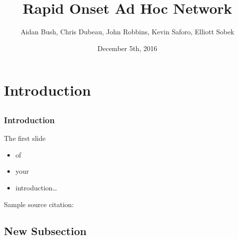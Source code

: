 \documentclass[compress]{beamer}
\title[Short Title]{Rapid Onset Ad Hoc Network}
\author[Short Author Names]{
  Aidan Bush,
  Chris Dubeau,
  John Robbins,
  Kevin Saforo,
  Elliott Sobek}
\date{December 5th, 2016}
\institute{\vspace{0.2em}
  \texttt{[image: macewan]}\\[0.25em]
}
\begin{document}


\section{Introduction}
\subsection*{}

\begin{frame}[t]
  \frametitle{Introduction}

  The first slide
  \begin{itemize}
  \item of
  \item your
  \item introduction\dots
  \end{itemize}

  \vfill

  \begin{tiny}
    \begin{minipage}{1.0\linewidth}
      Sample source citation: 
    \end{minipage}
  \end{tiny}
  
\end{frame}

\subsection{New Subsection}
\end{document}
